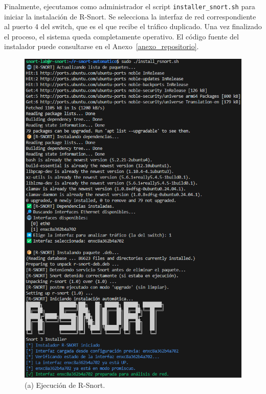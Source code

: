 \documentclass[12pt,a4paper]{report}
\begin{document}
\pagebreak

Finalmente, ejecutamos como administrador el script \texttt{installer\_snort.sh} para iniciar la instalación de R-Snort. Se selecciona la interfaz de red correspondiente al puerto 4 del switch, que es el que recibe el tráfico duplicado. Una vez finalizado el proceso, el sistema queda completamente operativo. El código fuente del instalador puede consultarse en el Anexo~\ref{anexo_repositorio}.

\begin{figure}[H]
	\centering
	\begin{minipage}[b]{0.48\textwidth}
		\centering
		\includegraphics[scale=0.4]{script_automatico/14.png}
		\caption*{(a) Ejecución de R-Snort.}
	\end{minipage}
	\hfill
	\begin{minipage}[b]{0.48\textwidth}

\end{minipage}
\end{figure}
\end{document}
